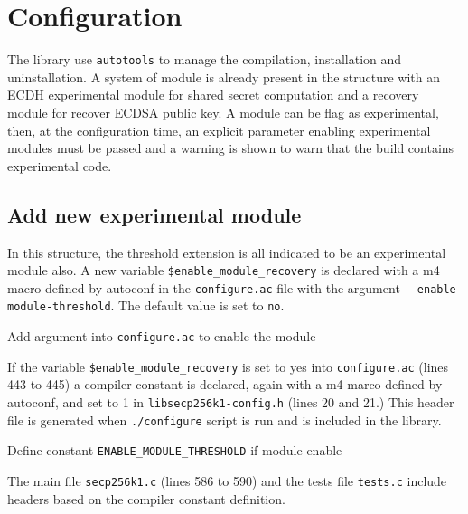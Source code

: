 \section{Configuration}

The library use \texttt{autotools} to manage the compilation, installation and
uninstallation. A system of module is already present in the structure with an
ECDH experimental module for shared secret computation and a recovery module for
recover ECDSA public key. A module can be flag as experimental, then, at the
configuration time, an explicit parameter enabling experimental modules must be
passed and a warning is shown to warn that the build contains experimental code.

\subsection{Add new experimental module}

In this structure, the threshold extension is all indicated to be an experimental
module also. A new variable \texttt{\$enable\_module\_recovery} is declared
with a m4 macro defined by autoconf in the
\texttt{configure.ac} file with the argument \texttt{-{}-enable-module-threshold}.
The default value is set to \texttt{no}.

\begin{listing}
	\caption{Add argument into \texttt{configure.ac} to enable the module}
	\label{lst:configureEnableThreshold}
\end{listing}

If the variable \texttt{\$enable\_module\_recovery} is set to yes into \texttt{configure.ac}
(lines 443 to 445) a compiler constant is declared, again with a m4 marco defined by
autoconf, and set to 1 in \texttt{libsecp256k1-config.h}
(lines 20 and 21.) This header file is generated when \texttt{./configure} script is run and
is included in the library.

\begin{listing}
	\caption{Define constant \texttt{ENABLE\_MODULE\_THRESHOLD} if module enable}
	\label{lst:defineEnableThreshold}
\end{listing}

The main file \texttt{secp256k1.c} (lines 586 to 590) and the tests file \texttt{tests.c}
include headers based on the compiler constant definition.

